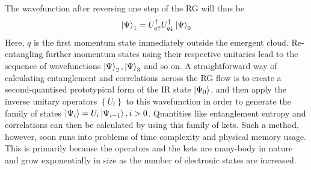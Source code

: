 \documentclass[prb]{revtex4-2}
\begin{document}
The wavefunction after reversing one step of the RG will thus be
\begin{equation}\begin{aligned}
	\ket{\Psi}_1 = U^\dagger_{q \uparrow}U^\dagger_{q \downarrow}\ket{\Psi}_0
\end{aligned}\end{equation}
Here, \(q\) is the first momentum state immediately outside the emergent cloud. Re-entangling further momentum states using their respective unitaries lead to the sequence of wavefunctions \(\ket{\Psi}_2, \ket{\Psi}_3\) and so on.
A straightforward way of calculating entanglement and correlations across the RG flow is to create a second-quantised prototypical form of the IR state \(\ket{\Psi_0}\), and then apply the inverse unitary operators \(\left\{ U_i \right\} \) to this wavefunction in order to generate the family of states \(\ket{\Psi_i} = U_i \ket{\Psi_{i-1}}, i > 0\). Quantities like entanglement entropy and correlations can then be calculated by using this family of kets. Such a method, however, soon runs into problems of time complexity and physical memory usage. This is primarily because the operators and the kets are many-body in nature and grow exponentially in size as the number of electronic states are increased.
\end{document}

